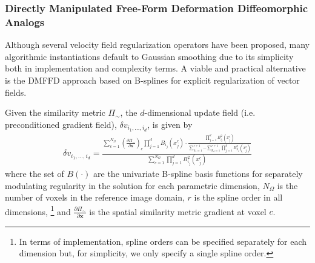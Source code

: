 \documentclass{frontiersSCNS}
\begin{document}
\subsubsection{Directly Manipulated Free-Form Deformation Diffeomorphic Analogs}

Although several velocity field regularization
operators have been proposed, many algorithmic instantiations
default to Gaussian smoothing due to its simplicity both in implementation
and complexity terms.  A viable and practical alternative is the DMFFD 
approach based on B-splines for explicit regularization of vector fields.

Given the similarity metric
$\Pi_{\sim}$, the $d$-dimensional update field (i.e. preconditioned
gradient field), $\delta v_{i_1,\ldots,i_d}$, is given by
\begin{align}
\label{eq:dmffd}
  \delta v_{i_1,\ldots,i_d} = \frac{ \sum_{c=1}^{N_{\Omega}} \left( \frac{\partial \Pi_\sim}{\partial \mathbf{x}} \right)_c \prod_{j=1}^d B_{i_j}(x_j^c)  
  \cdot \frac{\prod_{j=1}^d B_{i_j}^2 (x_j^c)}
  {\sum_{k_1=1}^{r+1}\ldots\sum_{k_d=1}^{r+1} 
  \prod_{j=1}^d B_{k_j}^2 (x_j^c)} }
  {\sum_{c=1}^{N_{\Omega}} \prod_{j=1}^d B_{i_j}^2 (x_j^c)}
\end{align}
where the set of $B(\cdot)$ are the univariate B-spline basis functions for
separately modulating regularity in the solution for each parametric dimension,
$N_\Omega$ is the number of voxels in the reference image domain,
$r$ is the spline order in all dimensions,%
\footnote{
In terms of implementation, spline orders can be specified separately for each dimension but, for simplicity,
we only specify a single spline order.
}
and $\frac{\partial \Pi_\sim}{\partial \mathbf{x}}$ is the spatial 
similarity metric gradient at voxel $c$.%
\end{document}
